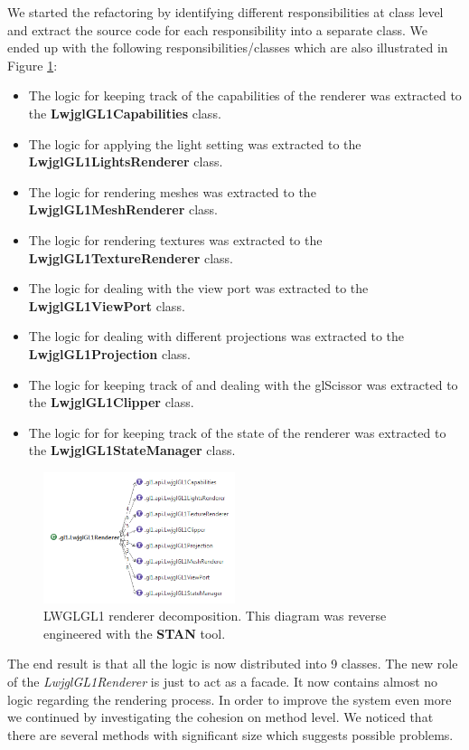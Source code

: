 \documentclass[a4paper, notitlepage]{article}
\begin{document}
We started the refactoring by identifying different responsibilities at class level and extract the source code for each responsibility into a separate class. We ended up with the following responsibilities/classes which are also illustrated in Figure \ref{fig:1}:

\begin{itemize}
\item The logic for keeping track of the capabilities of the renderer was extracted to the \textbf{LwjglGL1Capabilities} class.
\item The logic for applying the light setting was extracted to the \textbf{LwjglGL1LightsRenderer} class.
\item The logic for rendering meshes was extracted to the \textbf{LwjglGL1MeshRenderer} class.
\item The logic for rendering textures was extracted to the \textbf{LwjglGL1TextureRenderer} class.
\item The logic for dealing with the view port was extracted to the \textbf{LwjglGL1ViewPort} class.
\item The logic for dealing with different projections was extracted to the \textbf{LwjglGL1Projection} class.
\item The logic for keeping track of and dealing with the glScissor was extracted to the \textbf{LwjglGL1Clipper} class.
\item The logic for for keeping track of the state of the renderer was extracted to the \textbf{LwjglGL1StateManager} class.
\end{itemize}

\begin{figure}
\begin{center}
\includegraphics[width=0.50\textwidth]{graphics.png}
\end{center}
\caption{LWGLGL1 renderer decomposition. This diagram was reverse engineered with the \textbf{STAN} tool.}
\label{fig:1}
\end{figure} 


The end result is that all the logic is now distributed into 9 classes. The new role of the \textit{LwjglGL1Renderer} is just to act as a facade. It now contains almost no logic regarding the rendering process. In order to improve the system even more we continued by investigating the cohesion on method level. We noticed that there are several methods with significant size which suggests possible problems.
\end{document}
